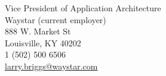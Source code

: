 {Vice President of Application Architecture
	\\ Waystar (current employer)
	\\ 888 W. Market St
	\\ Louisville, KY 40202
	\\ 1 (502) 500 6506 
	\\ \href{mailto:larry.briggs@waystar.com}{larry.briggs@waystar.com}}
